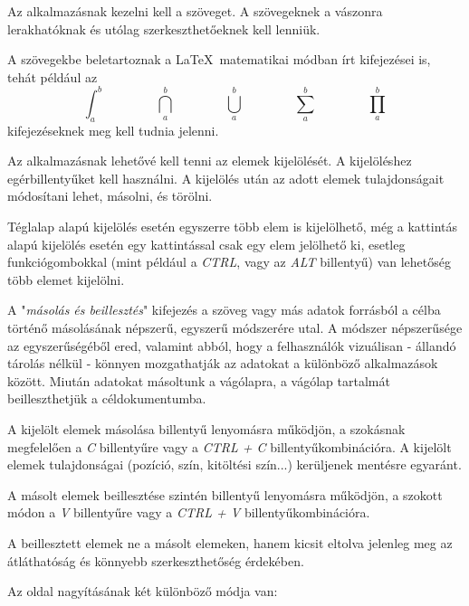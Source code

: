 
Az alkalmazásnak kezelni kell a szöveget. A szövegeknek a vászonra lerakhatóknak és utólag szerkeszthetőeknek kell lenniük. 

A szövegekbe beletartoznak a \LaTeX\ matematikai módban írt kifejezései is, tehát például az $$ \int_{a}^{b} \qquad\qquad \bigcap_{a}^{b} \qquad\qquad \bigcup_{a}^{b} \qquad\qquad \sum_{a}^{b} \qquad\qquad \prod_{a}^{b}$$ kifejezéseknek meg kell tudnia jelenni.


Az alkalmazásnak lehetővé kell tenni az elemek kijelölését. A kijelöléshez egérbillentyűket kell használni. A kijelölés után az adott elemek tulajdonságait módosítani lehet, másolni, és törölni. 

 Téglalap alapú kijelölés esetén egyszerre több elem is kijelölhető, még a kattintás alapú kijelölés esetén egy kattintással csak egy elem jelölhető ki, esetleg funkciógombokkal (mint például a \textit{CTRL}, vagy az \textit{ALT} billentyű) van lehetőség több elemet kijelölni.


A "\textit{másolás és beillesztés}" kifejezés a szöveg vagy más adatok forrásból a célba történő másolásának népszerű, egyszerű módszerére utal. A módszer népszerűsége az egyszerűségéből ered, valamint abból, hogy a felhasználók vizuálisan - állandó tárolás nélkül - könnyen mozgathatják az adatokat a különböző alkalmazások között. Miután adatokat másoltunk a vágólapra, a vágólap tartalmát beilleszthetjük a céldokumentumba.


A kijelölt elemek másolása billentyű lenyomásra működjön, a szokásnak megfelelően a \textit{C} billentyűre vagy a \textit{CTRL + C} billentyűkombinációra. A kijelölt elemek tulajdonságai (pozíció, szín, kitöltési szín...) kerüljenek mentésre egyaránt. 


A másolt elemek beillesztése szintén billentyű lenyomásra működjön, a szokott módon a \textit{V} billentyűre vagy a \textit{CTRL + V} billentyűkombinációra. 

A beillesztett elemek ne a másolt elemeken, hanem kicsit eltolva jelenleg meg az átláthatóság és könnyebb szerkeszthetőség érdekében.


Az oldal nagyításának két különböző módja van:

